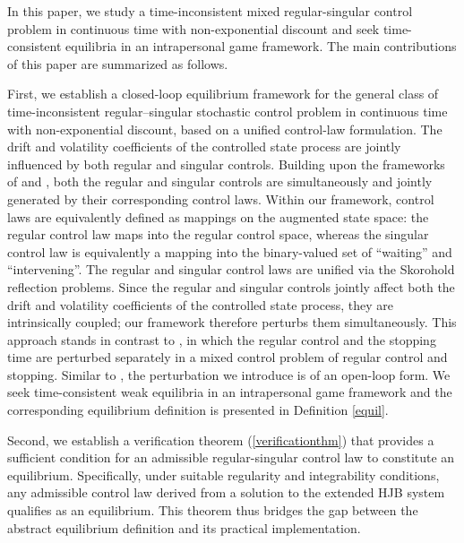 \documentclass[11pt,reqno]{article}%
\numberwithin{equation}{section}
\begin{document}
 In this paper, we study a time-inconsistent mixed regular-singular control problem in continuous time with non-exponential discount and seek time-consistent equilibria in an intrapersonal game framework. The main contributions of this paper are summarized as follows. 

 First, we establish a closed-loop equilibrium framework for the general class of time-inconsistent regular–singular stochastic control problem in continuous time with non-exponential discount, based on a unified control-law formulation. The drift and volatility coefficients of the controlled state process are jointly influenced by both regular and singular controls. Building upon the frameworks of \citet{bjork2017timeinconsistent} and \citet{liang2024equilibria}, both the regular and singular controls are simultaneously and jointly generated by their corresponding control laws. Within our framework, control laws are equivalently defined as mappings on the augmented state space: the regular control law maps into the regular control space, whereas the singular control law is equivalently a mapping into the binary-valued set of ``waiting'' and ``intervening''. The regular and singular control laws are unified via the Skorohold reflection problems. Since the regular and singular controls jointly affect both the drift and volatility coefficients of the controlled state process, they are intrinsically coupled; our framework therefore perturbs them simultaneously. This approach stands in contrast to \citet{liang2023weak}, in which the regular control and the stopping time are perturbed separately in a mixed control problem of regular control and stopping. Similar to \citet{liang2024equilibria}, the perturbation we introduce is of an open-loop form. We seek time-consistent weak equilibria in an intrapersonal game framework and the corresponding equilibrium definition is presented in Definition \ref{equil}.


 Second, we establish a verification theorem (\ref{verificationthm}) that provides a sufficient condition for an admissible regular-singular control law to constitute an equilibrium. Specifically, under suitable regularity and integrability conditions, any admissible control law derived from a solution to the extended HJB system qualifies as an equilibrium. This theorem thus bridges the gap between the abstract equilibrium definition and its practical implementation.
 
\end{document}
